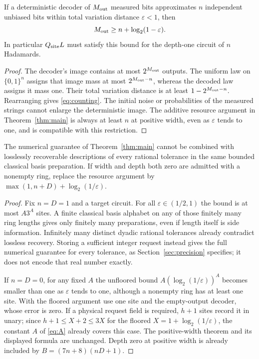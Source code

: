 \begin{proposition}\label{prop:counting}
If a deterministic decoder of $M_{\rm out}$ measured bits approximates $n$ independent unbiased bits within total variation distance $\varepsilon<1$, then
\begin{equation}\label{eq:counting}
 M_{\rm out}\ge n+\log_2(1-\varepsilon).
\end{equation}
In particular $Q_{\rm site}L$ must satisfy this bound for the depth-one circuit of $n$ Hadamards.
\end{proposition}
\begin{proof}
The decoder's image contains at most $2^{M_{\rm out}}$ outputs. The uniform law on $\{0,1\}^n$ assigns that image mass at most $2^{M_{\rm out}-n}$, whereas the decoded law assigns it mass one. Their total variation distance is at least $1-2^{M_{\rm out}-n}$. Rearranging gives \eqref{eq:counting}. The initial noise or probabilities of the measured strings cannot enlarge the deterministic image. The additive resource argument in Theorem~\ref{thm:main} is always at least $n$ at positive width, even as $\varepsilon$ tends to one, and is compatible with this restriction.
\end{proof}

\begin{proposition}\label{prop:precision}
The numerical guarantee of Theorem~\ref{thm:main} cannot be combined with losslessly recoverable descriptions of every rational tolerance in the same bounded classical basis preparation. If width and depth both zero are admitted with a nonempty ring, replace the resource argument by $\max(1,n+D)+\log_2(1/\varepsilon)$.
\end{proposition}
\begin{proof}
Fix $n=D=1$ and a target circuit. For all $\varepsilon\in(1/2,1)$ the bound is at most $A3^A$ sites. A finite classical basis alphabet on any of those finitely many ring lengths gives only finitely many preparations, even if length itself is side information. Infinitely many distinct dyadic rational tolerances already contradict lossless recovery. Storing a sufficient integer request instead gives the full numerical guarantee for every tolerance, as Section~\ref{sec:precision} specifies; it does not encode that real number exactly.

If $n=D=0$, for any fixed $A$ the unfloored bound $A(\log_2(1/\varepsilon))^A$ becomes smaller than one as $\varepsilon$ tends to one, although a nonempty ring has at least one site. With the floored argument use one site and the empty-output decoder, whose error is zero. If a physical request field is required, $h+1$ sites record it in unary; since $h+1\le X+2\le3X$ for the floored $X=1+\log_2(1/\varepsilon)$, the constant $A$ of \eqref{eq:A} already covers this case. The positive-width theorem and its displayed formula are unchanged. Depth zero at positive width is already included by $B=(7n+8)(nD+1)$.
\end{proof}

